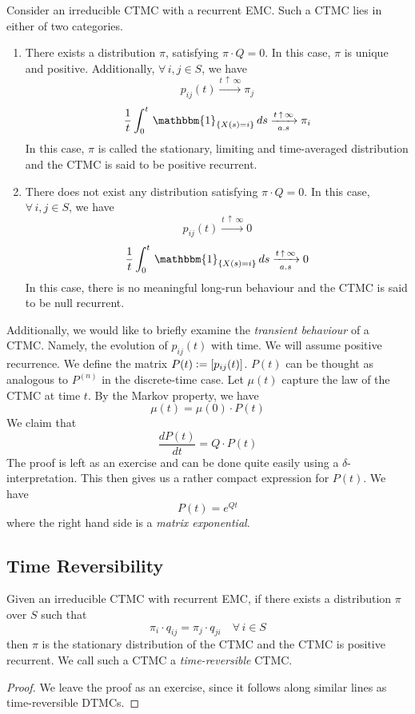 \documentclass[12pt]{article}
\theoremstyle{definition}
\begin{document}
\begin{thm}
    Consider an irreducible CTMC with a recurrent EMC. Such a CTMC lies in either of two categories. 
    \begin{enumerate}
        \item There exists a distribution $\pi$, satisfying $\pi \cdot Q = 0$. In this case, $\pi$ is unique and positive. Additionally, $\forall \, i,j \in S$, we have
        \[
            p_{ij}(t) \xrightarrow[]{t \, \uparrow \, \infty} \pi_j
        \]
        \[
            \frac{1}{t} \int_0^t \, \mathbbm{1}_{\left\{ X(s) = i \right\}} \, ds \xrightarrow[a.s]{t \, \uparrow \, \infty} \pi_i
        \]
        In this case, $\pi$ is called the stationary, limiting and time-averaged distribution and the CTMC is said to be positive recurrent.
        
        \item There does not exist any distribution satisfying $\pi \cdot Q = 0$. In this case, $\forall \, i,j \in S$, we have
        \[
            p_{ij}(t) \xrightarrow[]{t \, \uparrow \, \infty} 0
        \]
        \[
            \frac{1}{t} \int_0^t \, \mathbbm{1}_{\left\{X(s) = i \right\}} \, ds \xrightarrow[a.s]{t \, \uparrow \, \infty} 0
        \]
        In this case, there is no meaningful long-run behaviour and the CTMC is said to be null recurrent.
    \end{enumerate}
\end{thm}

Additionally, we would like to briefly examine the \emph{transient behaviour} of a CTMC. Namely, the evolution of $p_{ij}(t)$ with time. We will assume positive recurrence. We define the matrix $P(t) \vcentcolon= [p_{ij}(t)]$. $P(t)$ can be thought as analogous to $P^{(n)}$ in the discrete-time case. Let $\mu(t)$ capture the law of the CTMC at time $t$. By the Markov property, we have
\[
    \mu(t) = \mu(0) \cdot P(t)
\]
We claim that
\[
    \frac{dP(t)}{dt} = Q \cdot P(t)
\]
The proof is left as an exercise and can be done quite easily using a $\delta$-interpretation. This then gives us a rather compact expression for $P(t)$. We have
\[
    P(t) = e^{Qt}
\]  
where the right hand side is a \emph{matrix exponential}.

\newpage

\subsection{Time Reversibility}

\begin{thm}
    Given an irreducible CTMC with recurrent EMC, if there exists a distribution $\pi$ over $S$ such that
    \[
        \pi_i \cdot q_{ij} = \pi_j \cdot q_{ji} \quad \forall \, i \in S
    \]
    then $\pi$ is the stationary distribution of the CTMC and the CTMC is positive recurrent. We call such a CTMC a \emph{time-reversible} CTMC.
\end{thm}
\begin{proof}
    We leave the proof as an exercise, since it follows along similar lines as time-reversible DTMCs.
\end{proof}
\end{document}
